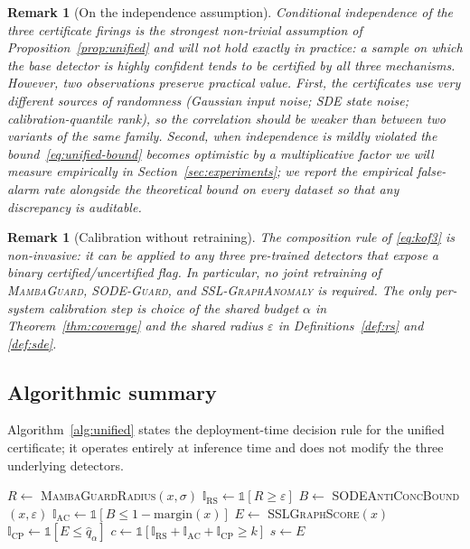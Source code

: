 \documentclass[journal,twoside]{IEEEtran}
\newtheorem{remark}[theorem]{Remark}
\begin{document}
\begin{remark}[On the independence assumption]
\label{rem:indep}
Conditional independence of the three certificate firings is the
strongest non-trivial assumption of Proposition~\ref{prop:unified} and
will not hold exactly in practice: a sample on which the base detector
is highly confident tends to be certified by all three mechanisms.
However, two observations preserve practical value. First, the
certificates use very different sources of randomness (Gaussian input
noise; SDE state noise; calibration-quantile rank), so the correlation
should be weaker than between two variants of the same family. Second,
when independence is mildly violated the bound~\eqref{eq:unified-bound}
becomes optimistic by a multiplicative factor we will measure
empirically in Section~\ref{sec:experiments}; we report the
\emph{empirical} false-alarm rate alongside the theoretical bound on
every dataset so that any discrepancy is auditable.
\end{remark}

\begin{remark}[Calibration without retraining]
The composition rule of \eqref{eq:kof3} is non-invasive: it can be
applied to any three pre-trained detectors that expose a binary
certified/uncertified flag. In particular, no joint retraining of
\textsc{MambaGuard}, \textsc{SODE-Guard}, and \textsc{SSL-GraphAnomaly}
is required. The only per-system calibration step is choice of the
shared budget $\alpha$ in Theorem~\ref{thm:coverage} and the shared
radius $\varepsilon$ in Definitions~\ref{def:rs} and \ref{def:sde}.
\end{remark}

\subsection{Algorithmic summary}
Algorithm~\ref{alg:unified} states the deployment-time decision rule
for the unified certificate; it operates entirely at inference time and
does not modify the three underlying detectors.

\begin{algorithm}[t]
\SetAlgoLined
{}
\BlankLine
$R \gets$ \textsc{MambaGuardRadius}$(x,\sigma)$\;
$\mathbb{I}_{\mathrm{RS}} \gets \mathbb{1}[R \ge \varepsilon]$\;
$B \gets$ \textsc{SODEAntiConcBound}$(x,\varepsilon)$\;
$\mathbb{I}_{\mathrm{AC}} \gets \mathbb{1}[B \le 1{-}\mathrm{margin}(x)]$\;
$E \gets$ \textsc{SSLGraphScore}$(x)$\;
$\mathbb{I}_{\mathrm{CP}} \gets \mathbb{1}[E \le \hat{q}_\alpha]$\;
$c \gets \mathbb{1}[\mathbb{I}_{\mathrm{RS}}+\mathbb{I}_{\mathrm{AC}}+
\mathbb{I}_{\mathrm{CP}} \ge k]$\;
$s \gets E$\;
\caption{Unified $k$-of-$3$ inference}
\label{alg:unified}
\end{algorithm}
\end{document}
